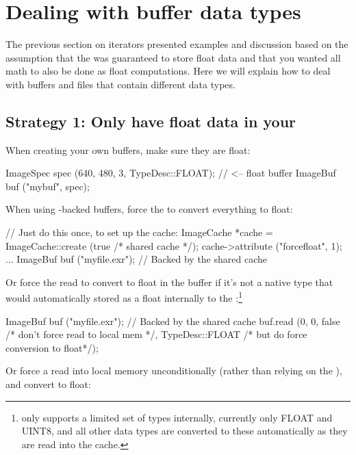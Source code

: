 \section{Dealing with buffer data types}

The previous section on iterators presented examples and discussion
based on the assumption that the \ImageBuf was guaranteed to store {\cf
float} data and that you wanted all math to also be done as {\cf float}
computations.  Here we will explain how to deal with buffers and files
that contain different data types.

\subsection*{Strategy 1: Only have {\cf float} data in your \ImageBuf}

\noindent When creating your own buffers, make sure they are {\cf float}:

\begin{code}
    ImageSpec spec (640, 480, 3, TypeDesc::FLOAT); // <-- float buffer
    ImageBuf buf ("mybuf", spec);
\end{code}

\noindent When using \ImageCache-backed buffers, force the \ImageCache
to convert everything to {\cf float}:

\begin{code}
    // Just do this once, to set up the cache:
    ImageCache *cache = ImageCache::create (true /* shared cache */);
    cache->attribute ("forcefloat", 1);
    ...
    ImageBuf buf ("myfile.exr");   // Backed by the shared cache
\end{code}

\noindent Or force the read to convert to {\cf float} in the buffer if
it's not a native type that would automatically stored as a {\cf float}
internally to the \ImageCache:\footnote{\ImageCache only supports a
limited set of types internally, currently only FLOAT and UINT8, and all
other data types are converted to these automatically as they are read
into the cache.}

\begin{code}
    ImageBuf buf ("myfile.exr");   // Backed by the shared cache
    buf.read (0, 0, false /* don't force read to local mem */,
              TypeDesc::FLOAT /* but do force conversion to float*/);
\end{code}

\noindent Or force a read into local memory unconditionally (rather
than relying on the \ImageCache), and convert to {\cf float}:

